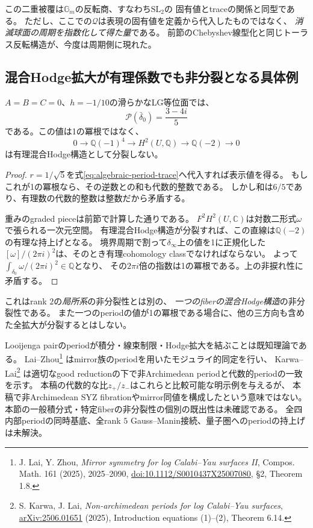 この二重被覆は$\mathbb G_m$の反転商、すなわち$\mathrm{SL}_2$の
固有値とtraceの関係と同型である。
ただし、ここでの$\mathcal Q$は表現の固有値を定義から代入したものではなく、
\emph{消滅球面の周期を指数化して得た量}である。
前節のChebyshev線型化と同じトーラス反転構造が、今度は周期側に現れた。

\subsection{混合Hodge拡大が有理係数でも非分裂となる具体例}
\begin{theorem}[非捩れperiodが検出する非分裂性]
\label{thm:explicit-nonsplit-MHS}
$A=B=C=0$、$h=-1/10$の滑らかなLG等位面では、
\[
 \mathcal P(\bar\delta_0)=\frac{3-4i}{5}
\]
である。この値は1の冪根ではなく、
\[
 0\longrightarrow\mathbb Q(-1)^4
 \longrightarrow H^2(U,\mathbb Q)
 \longrightarrow\mathbb Q(-2)\longrightarrow0
\]
は有理混合Hodge構造として分裂しない。
\end{theorem}
\begin{proof}
$r=1/\sqrt5$を式\eqref{eq:algebraic-period-trace}へ代入すれば表示値を得る。
もしこれが1の冪根なら、その逆数との和も代数的整数である。
しかし和は$6/5$であり、有理数の代数的整数は整数だから矛盾する。

重みのgraded pieceは前節で計算した通りである。
$F^2H^2(U,\mathbb C)$は対数二形式$\omega$で張られる一次元空間。
有理混合Hodge構造が分裂すれば、この直線は$\mathbb Q(-2)$の有理な持上げとなる。
境界周期で割って$\delta_\infty$上の値を1に正規化した
$[\omega]/(2\pi i)^2$は、そのとき有理cohomology classでなければならない。
よって$\int_{\delta_0}\omega/(2\pi i)^2\in\mathbb Q$となり、
その$2\pi i$倍の指数は1の冪根である。上の非捩れ性に矛盾する。
\end{proof}

これはrank $2$の\emph{局所系}の非分裂性とは別の、
\emph{一つのfiberの混合Hodge構造}の非分裂性である。
また一つのperiodの値が1の冪根である場合に、他の三方向も含めた全拡大が分裂するとはしない。

\begin{remark}
Looijenga pairのperiodが積分・線束制限・Hodge拡大を結ぶことは既知理論である。
Lai--Zhou\footnote{J. Lai, Y. Zhou, \emph{Mirror symmetry for log Calabi--Yau surfaces II},
Compos. Math. 161 (2025), 2025--2090,
\href{https://doi.org/10.1112/S0010437X25007080}{doi:10.1112/S0010437X25007080},
\S2, Theorem 1.8.}
はmirror族のperiodを用いたモジュライ的同定を行い、
Karwa--Lai\footnote{S. Karwa, J. Lai,
\emph{Non-archimedean periods for log Calabi--Yau surfaces},
\href{https://arxiv.org/abs/2506.01651}{arXiv:2506.01651} (2025),
Introduction equations (1)--(2), Theorem 6.14.}
は適切なgood reductionの下で非Archimedean periodと代数的periodの一致を示す。
本稿の代数的な比$z_+/z_-$はこれらと比較可能な明示例を与えるが、
本稿で非Archimedean SYZ fibrationやmirror同値を構成したという意味ではない。
本節の一般積分式・特定fiberの非分裂性の個別の既出性は未確認である。
全四内部periodの同時基底、全rank $5$ Gauss--Manin接続、量子圏へのperiodの持上げは未解決。
\end{remark}
